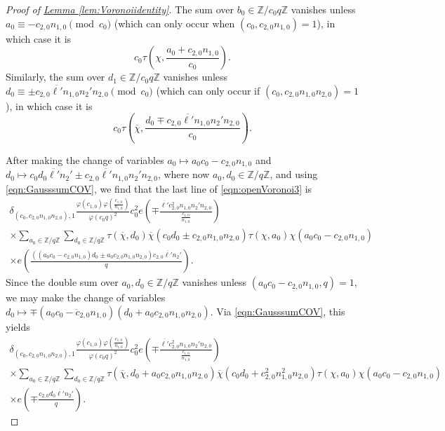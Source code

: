 \documentclass[11pt,a4paper]{amsart}
\newcommand{\Z}{\mathbb{Z}}
\numberwithin{equation}{section}
\theoremstyle{remark}
\theoremstyle{definition}
\begin{document}
\begin{proof}[Proof of {\hyperref[lem:Voronoiidentity]{Lemma \ref*{lem:Voronoiidentity}}}]
The sum over $b_0 \in \Z/c_0 q\Z$ vanishes unless $a_0 \equiv - c_{2,0} n_{1,0} \pmod{c_0}$ (which can only occur when $(c_0,c_{2,0} n_{1,0}) = 1$), in which case it is
\[c_0 \tau\left(\chi,\frac{a_0 + c_{2,0} n_{1,0}}{c_0}\right).\]
Similarly, the sum over $d_1 \in \Z/c_0 q\Z$ vanishes unless $d_0 \equiv \pm c_{2,0} \overline{\ell'} n_{1,0} n_2' n_{2,0} \pmod{c_0}$ (which can only occur if $(c_0,c_{2,0} n_{1,0} n_{2,0}) = 1$), in which case it is
\[c_0 \tau\left(\overline{\chi},\frac{d_0 \mp c_{2,0} \overline{\ell'} n_{1,0} n_2' n_{2,0}}{c_0}\right).\]

After making the change of variables $a_0 \mapsto a_0 c_0 - c_{2,0} n_{1,0}$ and $d_0 \mapsto c_0 d_0 \overline{\ell'} n_2' \pm c_{2,0} \overline{\ell'} n_{1,0} n_2' n_{2,0}$, where now $a_0, d_0 \in \Z/q\Z$, and using \eqref{eqn:GausssumCOV}, we find that the last line of \eqref{eqn:openVoronoi3} is
\begin{multline*}
\delta_{(c_0,c_{2,0} n_{1,0} n_{2,0}),1} \frac{\varphi(c_{1,0}) \varphi\left(\frac{c_{1,0}}{n_{1,0}}\right)}{\varphi(c_0 q)^2} c_0^2 e\left(\mp \frac{\overline{\ell'} c_{2,0}^2 n_{1,0} n_2' n_{2,0}}{\frac{c_{1,0}}{n_{1,0}}}\right)	\\
\times \sum_{a_0 \in \Z/q\Z} \sum_{d_0 \in \Z/q\Z} \tau(\overline{\chi},d_0) \overline{\chi}(c_0 d_0 \pm c_{2,0} n_{1,0} n_{2,0}) \tau(\chi,a_0) \chi(a_0 c_0 - c_{2,0} n_{1,0})	\\
\times e\left(\frac{((a_0 c_0 - c_{2,0} n_{1,0}) d_0 \pm a_0 c_{2,0} n_{1,0} n_{2,0}) c_{2,0} \overline{\ell'} n_2'}{q}\right).
\end{multline*}
Since the double sum over $a_0,d_0 \in \Z/q\Z$ vanishes unless $(a_0 c_0 - c_{2,0} n_{1,0},q) = 1$, we may make the change of variables $d_0 \mapsto \mp(\overline{a_0 c_0 - c_{2,0} n_{1,0}}) (d_0 + a_0 c_{2,0} n_{1,0} n_{2,0})$. Via \eqref{eqn:GausssumCOV}, this yields
\begin{multline*}
\delta_{(c_0,c_{2,0} n_{1,0} n_{2,0}),1} \frac{\varphi(c_{1,0}) \varphi\left(\frac{c_{1,0}}{n_{1,0}}\right)}{\varphi(c_0 q)^2} c_0^2 e\left(\mp \frac{\overline{\ell'} c_{2,0}^2 n_{1,0} n_2' n_{2,0}}{\frac{c_{1,0}}{n_{1,0}}}\right)	\\
\times \sum_{a_0 \in \Z/q\Z} \sum_{d_0 \in \Z/q\Z} \tau(\overline{\chi}, d_0 + a_0 c_{2,0} n_{1,0} n_{2,0}) \overline{\chi}(c_0 d_0 + c_{2,0}^2 n_{1,0}^2 n_{2,0}) \tau(\chi,a_0) \chi(a_0 c_0 - c_{2,0} n_{1,0})	\\
\times e\left(\mp \frac{c_{2,0} d_0 \overline{\ell'} n_2'}{q}\right).
\end{multline*}


\end{proof}
\end{document}
